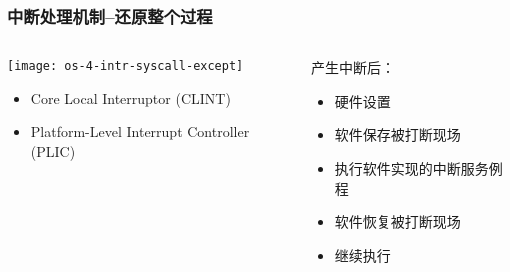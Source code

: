 \begin{frame}[plain,t]
	\frametitle{中断处理机制--还原整个过程}
	\begin{columns}
		
		\begin{column}{0.4\textwidth}
			\centering
			\texttt{[image: os-4-intr-syscall-except]}
			\begin{itemize} \small
				\item Core Local	Interruptor (CLINT)
				\item Platform-Level Interrupt Controller (PLIC)
			\end{itemize}
			
		\end{column}
		
		\begin{column}{0.5\textwidth}
			
			\centering
			产生中断后：
			\begin{itemize} \small 
				\item 硬件设置
				\item 软件保存被打断现场\pause
				\item 执行软件实现的中断服务例程
				\item 软件恢复被打断现场
				\item 继续执行
				
			\end{itemize}
			
		\end{column}
		
	\end{columns}
	
\end{frame}	



